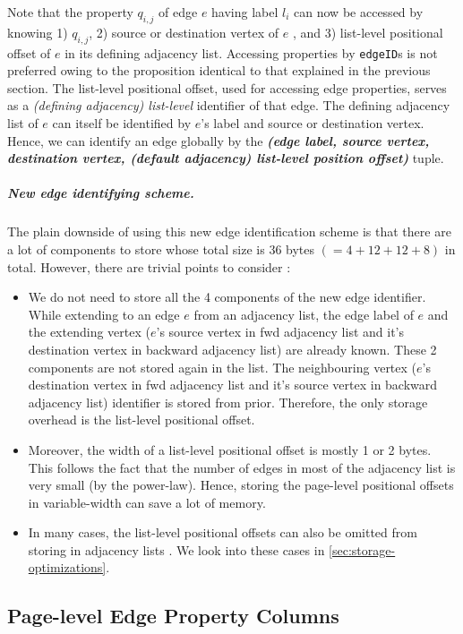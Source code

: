 Note that the property $q_{i,j}$ of edge $e$ having label $l_i$ can now be accessed by knowing 1) $q_{i,j}$, 2) source or destination vertex of $e$ , and 3) list-level positional offset of $e$ in its defining adjacency list. Accessing properties by \texttt{edgeID}s is not preferred owing to the proposition identical to that explained in the previous section. The list-level positional offset, used for accessing edge properties, serves as a \emph{(defining adjacency) list-level} identifier of that edge. The defining adjacency list of $e$ can itself be identified by $e$'s label and source or destination vertex. Hence, we can identify an edge globally by the \emph{\textbf{(edge label, source vertex, destination vertex, (default adjacency) list-level position offset)}} tuple. 

\vspace{-12pt}
\subparagraph{New edge identifying scheme.} The plain downside of using this new edge identification scheme is that there are a lot of components to store whose total size is 36 bytes $(=4+12+12+8)$ in total. However, there are trivial points to consider : 
\begin{itemize}
	\item We do not need to store all the 4 components of the new edge identifier. While extending to an edge $e$ from an adjacency list, the edge label of $e$ and the extending vertex ($e$'s source vertex in \gls{fwd} adjacency list and it's destination vertex in backward adjacency list) are already known. These 2 components are not stored again in the list. The neighbouring vertex ($e$'s destination vertex in \gls{fwd} adjacency list and it's source vertex in backward adjacency list) identifier is stored from prior. Therefore, the only storage overhead is the list-level positional offset.
	\item Moreover, the width of a list-level positional offset is mostly 1 or 2 bytes. This follows the fact that the number of edges in most of the adjacency list is very small (by the power-law). Hence, storing the page-level positional offsets in variable-width can save a lot of memory.
	\item In many cases, the list-level positional offsets can also be omitted from storing in adjacency lists . We look into these cases in \ref{sec:storage-optimizations}.
\end{itemize}

\subsection{Page-level Edge Property Columns}
\label{sec:page-level-edge-property-columns}

